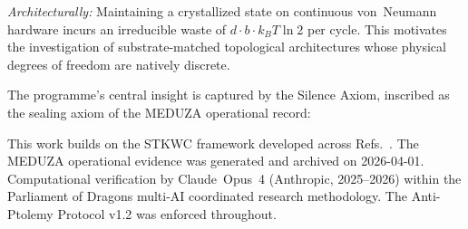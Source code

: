 \documentclass[reprint, aps, prl, amsmath, amssymb, floatfix]{revtex4-2}
\begin{document}
\emph{Architecturally:} Maintaining a crystallized state on
continuous von~Neumann hardware incurs an irreducible waste of
$d \cdot b \cdot k_B T \ln 2$ per cycle. This motivates the
investigation of substrate-matched topological architectures
whose physical degrees of freedom are natively discrete.

The programme's central insight is captured by the Silence Axiom,
inscribed as the sealing axiom of the MEDUZA operational record:

\medskip
\begin{center}
\end{center}

\begin{acknowledgments}
This work builds on the STKWC framework developed across
Refs.~\cite{NoGo2025,CSBoundary2025,DocD2026}. The MEDUZA
operational evidence was generated and archived on 2026-04-01.
Computational verification by Claude~Opus~4 (Anthropic, 2025--2026)
within the Parliament of Dragons multi-AI coordinated research
methodology. The Anti-Ptolemy Protocol v1.2 was enforced throughout.
\end{acknowledgments}
\end{document}
